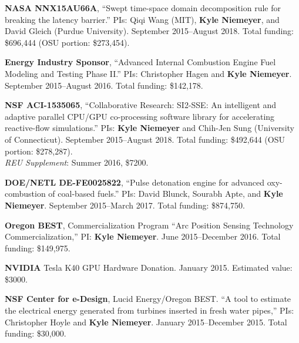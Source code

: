 \documentclass[margin,line,11pt]{res}
\newcommand*{\doi}[1]{\href{https://doi.org/#1}{\nolinkurl{https://doi.org/#1}}}
\begin{document}
\begin{resume}
\textbf{NASA NNX15AU66A}, ``Swept time-space domain decomposition rule for breaking the latency barrier.'' PIs: Qiqi Wang (MIT), \textbf{Kyle Niemeyer}, and David Gleich (Purdue University). September 2015--August 2018. Total funding: \$696,444 (OSU portion: \$273,454).

\textbf{Energy Industry Sponsor}, ``Advanced Internal Combustion Engine Fuel Modeling and Testing Phase II.'' PIs: Christopher Hagen and \textbf{Kyle Niemeyer}. September 2015--August 2016. Total funding: \$142,178.

\textbf{NSF ACI-1535065}, ``Collaborative Research: SI2-SSE: An intelligent and adaptive parallel CPU\slash GPU co-processing software library for accelerating reactive-flow simulations.'' PIs: \textbf{Kyle Niemeyer} and Chih-Jen Sung (University of Connecticut). September 2015--August 2018. Total funding: \$492,644 (OSU portion: \$278,287). \\
\textit{REU Supplement}: Summer 2016, \$7200.

\textbf{DOE\slash NETL DE-FE0025822}, ``Pulse detonation engine for advanced oxy-combustion of coal-based fuels.'' PIs: David Blunck, Sourabh Apte, and \textbf{Kyle Niemeyer}. September 2015--March 2017. Total funding: \$874,750.

\textbf{Oregon BEST}, Commercialization Program ``Arc Position Sensing Technology Commercialization,'' PI: \textbf{Kyle Niemeyer}. June 2015--December 2016. Total funding: \$149,975.

\textbf{NVIDIA} Tesla K40 GPU Hardware Donation. January 2015. Estimated value: \$3000.

\textbf{NSF Center for e-Design}, Lucid Energy\slash Oregon BEST. ``A tool to estimate the electrical energy generated from turbines inserted in fresh water pipes,'' PIs: Christopher Hoyle and \textbf{Kyle Niemeyer}. January 2015--December 2015. Total funding: \$30,000.


%
%
%


\end{resume}
\end{document}
